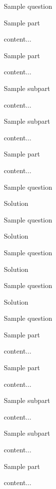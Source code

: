 \documentclass[12pt]{article} %
\begin{document}
\begin{qstn}[5][][]
	Sample question
\begin{assgnenum}
	\qitem Sample part
	\begin{soln}
		content...
	\end{soln}
	\qitem Sample part
	\begin{soln}
		content...
	\end{soln}
	\begin{assgnenum}
		\qitem Sample subpart
		\begin{soln}
			content...
		\end{soln}
		\qitem Sample subpart
		\begin{soln}
			content...
		\end{soln}
	\end{assgnenum}
	\qitem Sample part
	\begin{soln}
		content...
	\end{soln}
\end{assgnenum}
\end{qstn}

\begin{qstn}[6][][]
	Sample question
\begin{soln}
	Solution
\end{soln}
\end{qstn}

\begin{qstn}[7][][]
	Sample question
\begin{soln}
	Solution
\end{soln}
\end{qstn}

\begin{qstn}[8][][]
	Sample question
\begin{soln}
	Solution
\end{soln}
\end{qstn}

\begin{qstn}[9][][]
	Sample question
\begin{soln}
	Solution
\end{soln}
\end{qstn}

\begin{qstn}[10][][]
	Sample question
\begin{assgnenum}
	\qitem Sample part
	\begin{soln}
		content...
	\end{soln}
	\qitem Sample part
	\begin{soln}
		content...
	\end{soln}
	\begin{assgnenum}
		\qitem Sample subpart
		\begin{soln}
			content...
		\end{soln}
		\qitem Sample subpart
		\begin{soln}
			content...
		\end{soln}
	\end{assgnenum}
	\qitem Sample part
	\begin{soln}
		content...
	\end{soln}
\end{assgnenum}
\end{qstn}
\end{document}
